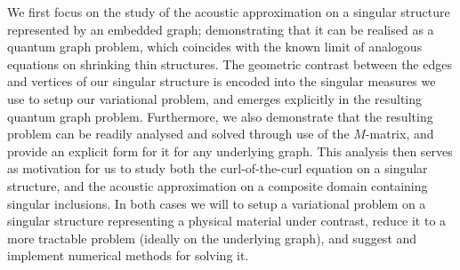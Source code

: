 We first focus on the study of the acoustic approximation on a singular structure represented by an embedded graph; demonstrating that it can be realised as a quantum graph problem, which coincides with the known limit of analogous equations on shrinking thin structures.
The geometric contrast between the edges and vertices of our singular structure is encoded into the singular measures we use to setup our variational problem, and emerges explicitly in the resulting quantum graph problem.
Furthermore, we also demonstrate that the resulting problem can be readily analysed and solved through use of the $M$-matrix, and provide an explicit form for it for any underlying graph.
This analysis then serves as motivation for us to study both the curl-of-the-curl equation on a singular structure, and the acoustic approximation on a composite domain containing singular inclusions.
In both cases we will to setup a variational problem on a singular structure representing a physical material under contrast, reduce it to a more tractable problem (ideally on the underlying graph), and suggest and implement numerical methods for solving it.